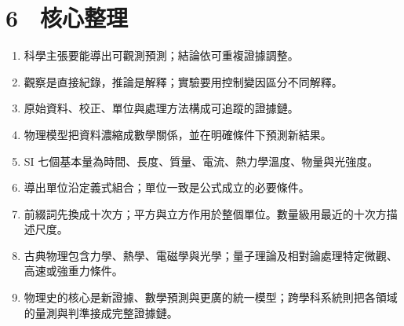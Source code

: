 \documentclass[11pt,a4paper]{article}
\providecommand{\tightlist}{%
  \setlength{\itemsep}{0pt}\setlength{\parskip}{0pt}}
\begin{document}
\section{6　核心整理}\label{ux6838ux5fc3ux6574ux7406}

\begin{enumerate}
\def\labelenumi{\arabic{enumi}.}
\tightlist
\item
  科學主張要能導出可觀測預測；結論依可重複證據調整。
\item
  觀察是直接紀錄，推論是解釋；實驗要用控制變因區分不同解釋。
\item
  原始資料、校正、單位與處理方法構成可追蹤的證據鏈。
\item
  物理模型把資料濃縮成數學關係，並在明確條件下預測新結果。
\item
  SI 七個基本量為時間、長度、質量、電流、熱力學溫度、物量與光強度。
\item
  導出單位沿定義式組合；單位一致是公式成立的必要條件。
\item
  前綴詞先換成十次方；平方與立方作用於整個單位。數量級用最近的十次方描述尺度。
\item
  古典物理包含力學、熱學、電磁學與光學；量子理論及相對論處理特定微觀、高速或強重力條件。
\item
  物理史的核心是新證據、數學預測與更廣的統一模型；跨學科系統則把各領域的量測與判準接成完整證據鏈。
\end{enumerate}
\end{document}
